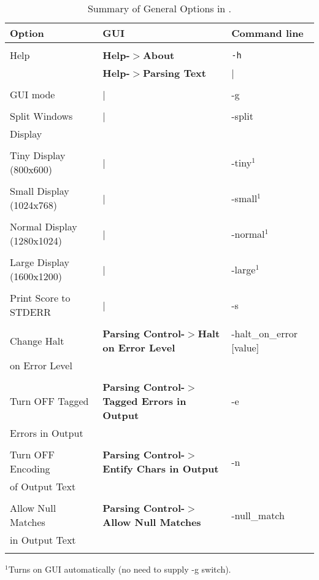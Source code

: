 {\footnotesize
\begin{table}
 \begin{center}
 \caption{Summary of General Options in \program .}
 \label{tab:option_summary}
  \vskip 12pt
  \begin{tabular}{|lll|} \hline
Option & GUI & Command line \\ \hline\hline 
 & & \\
 Help & {\bf Help-$>$About} & {\tt -h} \\ 
      & {\bf Help-$>$Parsing Text} & | \\ 
 & & \\
 GUI mode & | & -g \\
 & & \\
 Split Windows & | & -split \\
 Display & & \\
 & & \\
 Tiny Display (800x600) & | & -tiny$^{1}$ \\
 & & \\
 Small Display (1024x768) & | & -small$^{1}$ \\
 & & \\
 Normal Display (1280x1024) & | & -normal$^{1}$ \\
 & & \\
 Large Display (1600x1200) & | & -large$^{1}$ \\
 & & \\
Print Score to STDERR & | & -s \\
 & & \\
Change Halt & {\bf Parsing Control-$>$Halt on Error Level} & -halt\_on\_error [value] \\
on Error Level & & \\
 & & \\
Turn OFF Tagged & {\bf Parsing Control-$>$Tagged Errors in Output} & -e \\
Errors in Output & & \\
 & & \\
Turn OFF Encoding & {\bf Parsing Control-$>$Entify Chars in Output} & -n \\
of Output Text & & \\
 & & \\
Allow Null Matches& {\bf Parsing Control-$>$Allow Null Matches}  & -null\_match \\
in Output Text & & \\
 & &  \\ \hline
   \end{tabular}
  \end{center}
$^{1}$Turns on GUI automatically (no need to supply -g switch).
\end{table}
}

